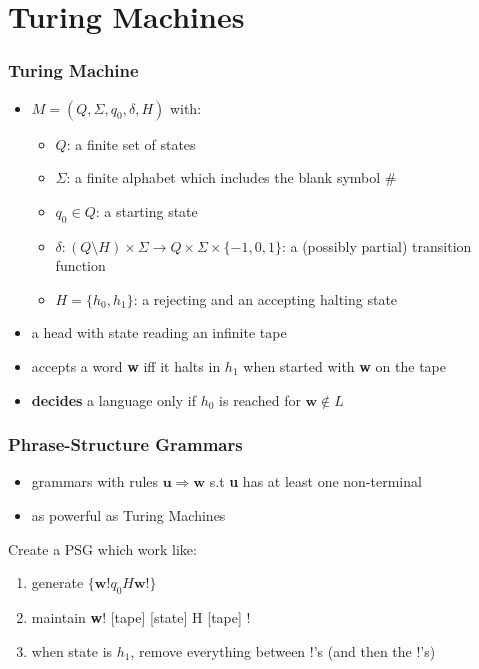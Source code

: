 \documentclass{beamer}
\begin{document}
\section{Turing Machines}

\begin{frame}
\frametitle{Turing Machine}
\begin{itemize}
\item $M = (Q, \Sigma, q_0, \delta, H)$ with:
  \begin{itemize}
  \item $Q$: a finite set of states
  \item $\Sigma$: a finite alphabet which includes the blank symbol \#
  \item $q_0 \in Q$: a starting state
  \item $\delta: (Q \setminus H) \times \Sigma \rightarrow Q \times \Sigma
    \times \{-1, 0, 1\}$: a (possibly partial) transition function
  \item $H = \{h_0, h_1\}$: a rejecting and an accepting halting state
  \end{itemize}
\item a head with state reading an infinite tape
\item accepts a word \textbf{w} iff it halts in $h_1$ when started with \textbf{w} on the tape
\item \textbf{decides} a language only if $h_0$ is reached for $\mathbf{w} \not\in L$
\end{itemize}
\end{frame}


\begin{frame}
\frametitle{Phrase-Structure Grammars}
\begin{itemize}
\item grammars with rules $\mathbf{u} \Rightarrow \mathbf{w}$ s.t \textbf{u} has
  at least one non-terminal
\item as powerful as Turing Machines
\end{itemize}
\begin{block}{}
Create a PSG which work like:
 \begin{enumerate}
 \item generate $\{\mathbf{w}!q_0H\mathbf{w}!\}$
 \item maintain \textbf{w}! [tape] [state] H [tape] !
 \item when state is $h_1$, remove everything between !'s (and then the !'s)
 \end{enumerate}
\end{block}
\end{frame}
\end{document}
